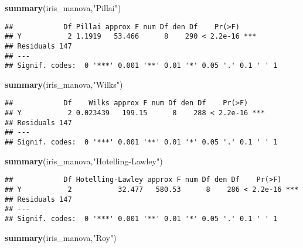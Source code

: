\documentclass[
]{article}
\newenvironment{Shaded}{\begin{snugshade}}{\end{snugshade}}
\newcommand{\KeywordTok}[1]{\textcolor[rgb]{0.13,0.29,0.53}{\textbf{#1}}}
\newcommand{\NormalTok}[1]{#1}
\newcommand{\StringTok}[1]{\textcolor[rgb]{0.31,0.60,0.02}{#1}}
\begin{document}
\begin{Shaded}
\begin{Highlighting}[]
\KeywordTok{summary}\NormalTok{(iris_manova,}\StringTok{"Pillai"}\NormalTok{)}
\end{Highlighting}
\end{Shaded}

\begin{verbatim}
##            Df Pillai approx F num Df den Df    Pr(>F)    
## Y           2 1.1919   53.466      8    290 < 2.2e-16 ***
## Residuals 147                                            
## ---
## Signif. codes:  0 '***' 0.001 '**' 0.01 '*' 0.05 '.' 0.1 ' ' 1
\end{verbatim}

\begin{Shaded}
\begin{Highlighting}[]
\KeywordTok{summary}\NormalTok{(iris_manova,}\StringTok{"Wilks"}\NormalTok{)  }
\end{Highlighting}
\end{Shaded}

\begin{verbatim}
##            Df    Wilks approx F num Df den Df    Pr(>F)    
## Y           2 0.023439   199.15      8    288 < 2.2e-16 ***
## Residuals 147                                              
## ---
## Signif. codes:  0 '***' 0.001 '**' 0.01 '*' 0.05 '.' 0.1 ' ' 1
\end{verbatim}

\begin{Shaded}
\begin{Highlighting}[]
\KeywordTok{summary}\NormalTok{(iris_manova,}\StringTok{"Hotelling-Lawley"}\NormalTok{) }
\end{Highlighting}
\end{Shaded}

\begin{verbatim}
##            Df Hotelling-Lawley approx F num Df den Df    Pr(>F)    
## Y           2           32.477   580.53      8    286 < 2.2e-16 ***
## Residuals 147                                                      
## ---
## Signif. codes:  0 '***' 0.001 '**' 0.01 '*' 0.05 '.' 0.1 ' ' 1
\end{verbatim}

\begin{Shaded}
\begin{Highlighting}[]
\KeywordTok{summary}\NormalTok{(iris_manova,}\StringTok{"Roy"}\NormalTok{) }
\end{Highlighting}
\end{Shaded}
\end{document}
